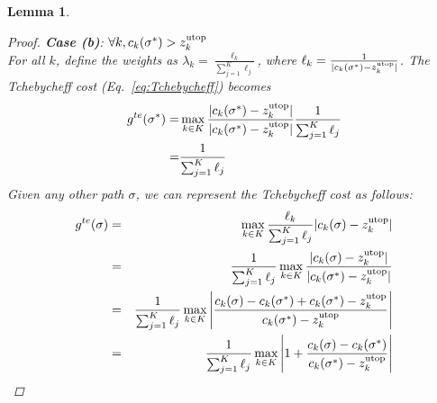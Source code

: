 \documentclass{article}
\newtheorem{lem}{Lemma}
\begin{document}
\begin{lem}
\begin{proof}
\textit{\textbf{Case (b)}}: $\forall k,  c_{k}( \sigma^{*} ) > z^{\rm utop}_{k}$\\
For all $k$, define the weights as
$\lambda_{k} = \frac{ \ell_{k} }{ \sum_{j=1}^K \ell_{j} }$, where
$ \ell_{k} =\frac{1}{| c_{k}(\sigma^*)-z^{\rm utop}_{k} |} $.
The Tchebycheff cost (Eq.~\eqref{eq:Tchebycheff}) becomes
\begin{equation}
\begin{aligned}
	g^{te} ( \sigma^{*} ) %
	=& \max_{k \in K}  \frac{| c_{k}( \sigma^* ) - z^{\rm utop}_{k} |}{ | c_{k}( \sigma^* ) - z^{\rm utop}_{k} |} \frac{1}{\sum_{j=1}^K \ell_j} \\
	=& \frac{1}{\sum_{j=1}^K \ell_j} \\
\end{aligned}
\end{equation}
%
Given any other path $ \sigma $, we can represent the Tchebycheff cost as follows:
\begin{eqnarray*}
 g^{te} ( \sigma )%
 &=& \max_{k\in K} \frac{ \ell_{k} }{ \sum_{j=1}^K \ell_{j} } | c_{k}( \sigma ) - z^{\rm utop}_{k} | \\
 &= & \frac{1}{\sum_{j=1}^K \ell_j}\max_{k \in K} \frac{ | c_{k}( \sigma ) - z^{\rm utop}_{k} |  }{ | c_{k} ( \sigma^{*} ) - z^{\rm utop}_{k} | } \\%
 &= & \frac{1}{\sum_{j=1}^K \ell_j}\max_{k \in K} \left| \frac{ c_{k}( \sigma ) - c_{k} ( \sigma^{*} )  +  c_{k} ( \sigma^{*} ) - z^{\rm utop}_{k}  }{  c_{k} ( \sigma^{*} ) - z^{\rm utop}_{k} } \right| \\
 &= & \frac{1}{\sum_{j=1}^K \ell_j} \max_{k \in K} \left| 1 + \frac{ c_{k}( \sigma ) - c_{k} ( \sigma^{*} )  }{  c_{k} ( \sigma^{*} ) - z^{\rm utop}_{k} } \right|

\end{eqnarray*}
\end{proof}
\end{lem}
\end{document}
